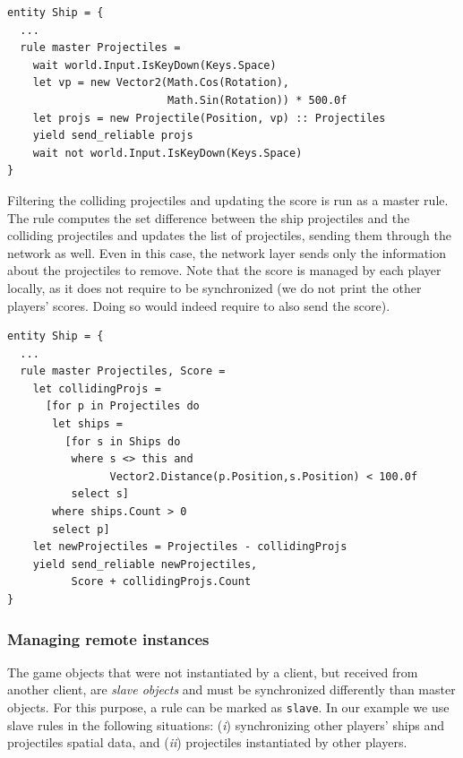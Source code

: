 \begin{enumerate}[leftmargin=*,labelsep=3mm,label=\roman*]
\begin{lstlisting}
entity Ship = {
  ...
  rule master Projectiles =
    wait world.Input.IsKeyDown(Keys.Space)
    let vp = new Vector2(Math.Cos(Rotation), 
                         Math.Sin(Rotation)) * 500.0f
    let projs = new Projectile(Position, vp) :: Projectiles
    yield send_reliable projs
    wait not world.Input.IsKeyDown(Keys.Space)
}
\end{lstlisting}

	Filtering the colliding projectiles and updating the score is run as a master rule. The rule computes the set difference between the ship projectiles and the colliding projectiles and updates the list of projectiles, sending them through the network as well. Even in this case, the network layer sends only the information about the projectiles to remove. Note that the score is managed by each player locally, as it does not require to be synchronized (we do not print the other players' scores. Doing so would indeed require to also send the score).
	
\begin{lstlisting}
entity Ship = {
  ...
  rule master Projectiles, Score =
    let collidingProjs =
      [for p in Projectiles do
       let ships =
         [for s in Ships do
          where s <> this and 
                Vector2.Distance(p.Position,s.Position) < 100.0f
          select s]
       where ships.Count > 0
       select p]
    let newProjectiles = Projectiles - collidingProjs
    yield send_reliable newProjectiles, 
          Score + collidingProjs.Count 
}
\end{lstlisting}
\end{enumerate}

\subsubsection{Managing remote instances}
The game objects that were not instantiated by a client, but received from another client, are \textit{slave objects} and must be synchronized differently than master objects. For this purpose, a rule can be marked as \texttt{slave}. In our example we use slave rules in the following situations: (\textit{i}) synchronizing other players' ships and projectiles spatial data, and (\textit{ii}) projectiles instantiated by other players.

